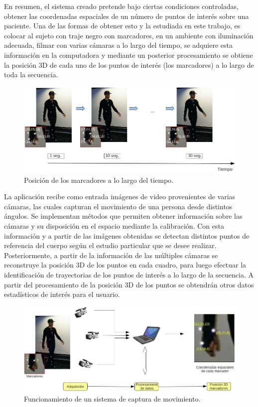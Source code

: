 En resumen, el sistema creado pretende bajo ciertas condiciones controladas, obtener las coordenadas espaciales de un número de puntos de interés sobre una paciente. Una de las formas de obtener esto y la estudiada en este trabajo, es colocar al sujeto con traje negro con marcadores, en un ambiente con iluminación adecuada, filmar con varias cámaras a lo largo del tiempo, se adquiere esta información en la computadora y mediante un posterior procesamiento se obtiene la posición 3D de cada uno de los puntos de interés (los marcadores) a lo largo de toda la secuencia.

\begin{figure}[H]
\begin{center}
\includegraphics[scale=0.4]{img/Sistema_completo/diagrama_abuelas_2.jpg}
\end{center}
\caption{Posición de los marcadores a lo largo del tiempo.}
\label{abuela2}
\end{figure}

La aplicación recibe como entrada imágenes de video provenientes de varias cámaras, las cuales capturan el movimiento de una persona desde distintos ángulos. Se implementan métodos que permiten obtener información sobre las cámaras y su disposición en el espacio mediante la calibración. Con esta información y a partir de las imágenes obtenidas se detectan distintos puntos de referencia del cuerpo según el estudio particular que se desee realizar. Posteriormente, a partir de la información de las múltiples cámaras se reconstruye la posición 3D de los puntos en cada cuadro, para luego efectuar la identificación de trayectorias de los puntos de interés a lo largo de la secuencia. A partir del procesamiento de la posición 3D de los puntos se obtendrán otros datos estadísticos de interés para el usuario.

\begin{figure}[H]
\begin{center}
\includegraphics[scale=0.4]{img/Sistema_completo/diagrama_abuelas_1.jpg}
\end{center}
\caption{Funcionamiento de un sistema de captura de movimiento.}
\label{abuela1}
\end{figure}

